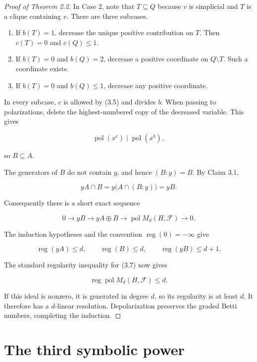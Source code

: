 \documentclass[11pt]{article}
\theoremstyle{definition}
\theoremstyle{remark}
\numberwithin{equation}{section}
\begin{document}
\begin{proof}[Proof of Theorem 2.2]
In Case 2, note that $T\subseteq Q$ because $v$ is simplicial and $T$ is a
clique containing $v$. There are three subcases.

\begin{enumerate}
\item If $b(T)=1$, decrease the unique positive contribution on $T$. Then
   $c(T)=0$ and $c(Q)\leq1$.
\item If $b(T)=0$ and $b(Q)=2$, decrease a positive coordinate on $Q\setminus T$.
   Such a coordinate exists.
\item If $b(T)=0$ and $b(Q)\leq1$, decrease any positive coordinate.
\end{enumerate}

In every subcase, $c$ is allowed by (3.5) and divides $b$. When passing to
polarizations, delete the highest-numbered copy of the decreased variable.
This gives

\nopagebreak[4]
\[
\operatorname{pol}(x^c)\mid\operatorname{pol}(x^b),
\]

so $B\subseteq A$.
\hfill\qedsymbol
\par\medskip


The generators of $B$ do not contain $y$, and hence $(B:y)=B$. By Claim 3.1,

\nopagebreak[4]
\[
yA\cap B
=y\bigl(A\cap(B:y)\bigr)
=yB.
\tag{3.6}
\]

Consequently there is a short exact sequence

\nopagebreak[4]
\[
0\longrightarrow yB
\longrightarrow yA\oplus B
\longrightarrow \operatorname{pol}M_d(H,\mathcal F)
\longrightarrow0.
\tag{3.7}
\]

The induction hypotheses and the convention $\operatorname{reg}(0)=-\infty$
give

\nopagebreak[4]
\[
\operatorname{reg}(yA)\leq d,
\qquad
\operatorname{reg}(B)\leq d,
\qquad
\operatorname{reg}(yB)\leq d+1.
\]

The standard regularity inequality for (3.7) now gives

\nopagebreak[4]
\[
\operatorname{reg}\operatorname{pol}M_d(H,\mathcal F)\leq d.
\]

If this ideal is nonzero, it is generated in degree $d$, so its regularity is
at least $d$. It therefore has a $d$-linear resolution. Depolarization
preserves the graded Betti numbers, completing the induction.
\end{proof}


\section{The third symbolic power}
\end{document}
